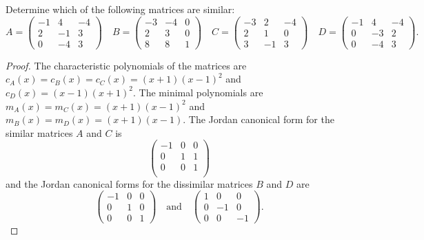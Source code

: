 \documentclass[10pt]{amsart}
\begin{document}
\begin{thm}
  \label{Ex3}
  Determine which of the following matrices are similar:
  $$
  A = \begin{pmatrix}
    -1 & 4 & -4\\
    2 & -1 & 3\\
    0 & -4 & 3
  \end{pmatrix}
  \quad
  B = \begin{pmatrix}
    -3 & -4 & 0\\
    2 & 3 & 0\\
    8 & 8 & 1
  \end{pmatrix}
  \quad
  C = \begin{pmatrix}
    -3 & 2 & -4\\
    2 & 1 & 0\\
    3 & -1 & 3
  \end{pmatrix}
  \quad
  D = \begin{pmatrix}
    -1 & 4 & -4\\
    0 & -3 & 2\\
    0 & -4 & 3
  \end{pmatrix}.
  $$
  \begin{proof}
    The characteristic polynomials of the matrices are $c_A(x) = c_B(x) = c_C(x) =  (x+1)(x-1)^2$ and $c_D(x) = (x-1)(x+1)^2$.
    The minimal polynomials are $m_A(x) = m_C(x) = (x+1)(x-1)^2$ and $m_B(x) = m_D(x) = (x+1)(x-1)$.
    The Jordan canonical form for the similar matrices $A$ and $C$ is 
    $$
    \begin{pmatrix}
      -1 & 0 & 0\\
      0 & 1 & 1\\
      0 & 0 & 1\\
    \end{pmatrix}
    $$
    and the Jordan canonical forms for the dissimilar matrices $B$ and $D$ are 
    $$
    \begin{pmatrix}
      -1 & 0 & 0\\
      0 & 1 & 0\\
      0 & 0 & 1
    \end{pmatrix}
    \quad \text{and} \quad
    \begin{pmatrix}
      1 & 0 & 0\\
      0 & -1 & 0\\
      0 & 0 & -1
    \end{pmatrix}.
    $$
  \end{proof}
\end{thm}
\end{document}
